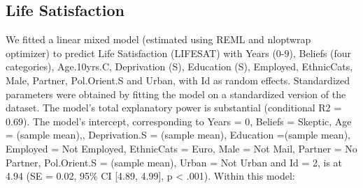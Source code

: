 \documentclass[
  english,
  man]{apa6}
\begin{document}
\hypertarget{life-satisfaction-1}{%
\subsection{Life Satisfaction}\label{life-satisfaction-1}}

We fitted a linear mixed model (estimated using REML and nloptwrap optimizer) to predict Life Satisfaction (LIFESAT) with Years (0-9), Beliefs (four categories), Age.10yrs.C, Deprivation (S), Education (S), Employed, EthnicCats, Male, Partner, Pol.Orient.S and Urban, with Id as random effects. Standardized parameters were obtained by fitting the model on a standardized version of the dataset. The model's total explanatory power is substantial (conditional R2 = 0.69). The model's intercept, corresponding to Years = 0, Beliefs = Skeptic, Age = (sample mean),, Deprivation.S = (sample mean), Education =(sample mean), Employed = Not Employed, EthnicCats = Euro, Male = Not Mail, Partner = No Partner, Pol.Orient.S = (sample mean), Urban = Not Urban and Id = 2, is at 4.94 (SE = 0.02, 95\% CI {[}4.89, 4.99{]}, p \textless{} .001). Within this model:
\end{document}
